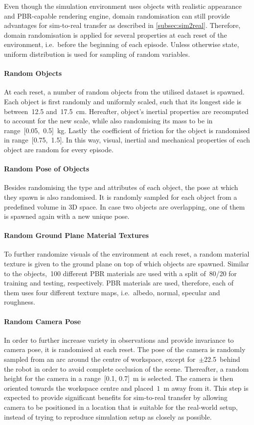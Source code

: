 Even though the simulation environment uses objects with realistic appearance and PBR-capable rendering engine, domain randomisation can still provide advantages for sim-to-real transfer as described in \autoref{subsec:sim2real}. Therefore, domain randomisation is applied for several properties at each reset of the environment, i.e.~before the beginning of each episode. Unless otherwise state, uniform distribution is used for sampling of random variables.

\paragraph{Random Objects} At each reset, a number of random objects from the utilised dataset is spawned. Each object is first randomly and uniformly scaled, such that its longest side is between~12.5 and~17.5~cm. Hereafter, object's inertial properties are recomputed to account for the new scale, while also randomising its mass to be in range~[0.05,~0.5]~kg. Lastly~the coefficient of friction for the object is randomised in range~[0.75,~1.5]. In this way, visual, inertial and mechanical properties of each object are random for every episode.

\paragraph{Random Pose of Objects} Besides randomising the type and attributes of each object, the pose at which they spawn is also randomised. It is randomly sampled for each object from a predefined volume in 3D space. In case two objects are overlapping, one of them is spawned again with a new unique pose.

\paragraph{Random Ground Plane Material Textures} To further randomize visuals of the environment at each reset, a random material texture is given to the ground plane on top of which objects are spawned. Similar to the objects,~100 different PBR materials are used with a split of~80/20 for training and testing, respectively. PBR materials are used, therefore, each of them uses four different texture maps, i.e.~albedo, normal, specular and roughness.

\paragraph{Random Camera Pose} In order to further increase variety in observations and provide invariance to camera pose, it is randomised at each reset. The pose of the camera is randomly sampled from an arc around the centre of workspace, except for~\(\pm\)22.5\textdegree\ behind the robot in order to avoid complete occlusion of the scene. Thereafter, a random height for the camera in a range~[0.1, 0.7]~m is selected. The camera is then oriented towards the workspace centre and placed~\(1\)~m away from it. This step is expected to provide significant benefits for sim-to-real transfer by allowing camera to be positioned in a location that is suitable for the real-world setup, instead of trying to reproduce simulation setup as closely as possible.

